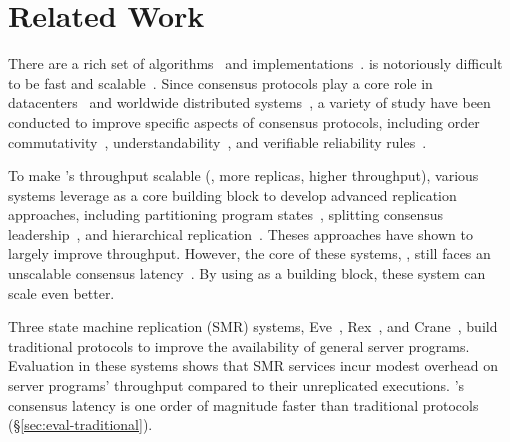 \section{Related Work} \label{sec:related}


 There are a rich set of
\paxos algorithms~\cite{paxos:practical,paxos,paxos:simple,paxos:complex,
epaxos:sosp13} and 
implementations~\cite{paxos:live,paxos:practical,chubby:osdi,crane:sosp15}. 
\paxos is notoriously difficult to be fast and 
scalable~\cite{ellis:thesis,manos:hotdep10,scatter:sosp11}. Since consensus 
protocols play a core role in datacenters~\cite{matei:hotcloud11, mesos:nsdi11, 
datacenter:os} and worldwide 
distributed systems~\cite{spanner:osdi12,mencius:osdi08}, a variety of study 
have been conducted to improve specific aspects of consensus protocols, 
including order commutativity~\cite{epaxos:sosp13}, 
understandability~\cite{raft:usenix14,paxos}, and verifiable reliability 
rules~\cite{modist:nsdi09,demeter:sosp11}.



To make \paxos's throughput scalable (\ie, more replicas, higher throughput), 
various systems leverage \paxos as a core building block to develop advanced 
replication approaches, including partitioning program 
states~\cite{scatter:sosp11,ssmr:dsn14}, splitting consensus 
leadership~\cite{mencius:osdi08,spaxos:srds12}, and hierarchical 
replication~\cite{manos:hotdep10,scatter:sosp11}. Theses approaches have shown 
to largely improve throughput. However, the core of these systems, 
\paxos, still faces an unscalable consensus 
latency~\cite{ellis:thesis,scatter:sosp11,manos:hotdep10}. By using \xxx as a 
building block, these system can scale even better.




Three state machine replication (SMR) systems, Eve~\cite{eve:osdi12}, 
Rex~\cite{rex:eurosys14}, and Crane~\cite{crane:sosp15}, build traditional 
\paxos protocols to improve the availability of general server programs. 
Evaluation in these systems shows that SMR services incur modest overhead on 
server programs' throughput compared to their unreplicated executions. \xxx's 
consensus latency is one order of magnitude faster than traditional protocols 
(\S\ref{sec:eval-traditional}).


